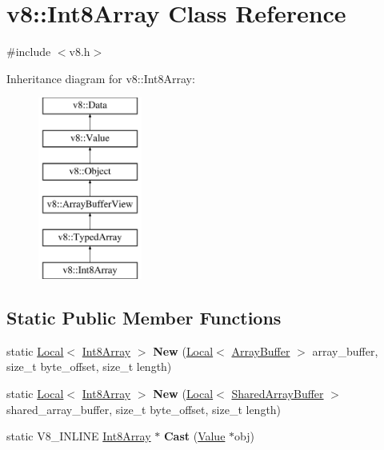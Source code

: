 \hypertarget{classv8_1_1Int8Array}{}\section{v8\+:\+:Int8\+Array Class Reference}
\label{classv8_1_1Int8Array}


{\ttfamily \#include $<$v8.\+h$>$}

Inheritance diagram for v8\+:\+:Int8\+Array\+:\begin{figure}[H]
\begin{center}
\leavevmode
\includegraphics[height=6.000000cm]{classv8_1_1Int8Array}
\end{center}
\end{figure}
\subsection*{Static Public Member Functions}
\begin{DoxyCompactItemize}
\item 
static \hyperlink{classv8_1_1Local}{Local}$<$ \hyperlink{classv8_1_1Int8Array}{Int8\+Array} $>$ {\bfseries New} (\hyperlink{classv8_1_1Local}{Local}$<$ \hyperlink{classv8_1_1ArrayBuffer}{Array\+Buffer} $>$ array\+\_\+buffer, size\+\_\+t byte\+\_\+offset, size\+\_\+t length)\hypertarget{classv8_1_1Int8Array_a13e12d1a556aa2ef92271484a10acd21}{}\label{classv8_1_1Int8Array_a13e12d1a556aa2ef92271484a10acd21}

\item 
static \hyperlink{classv8_1_1Local}{Local}$<$ \hyperlink{classv8_1_1Int8Array}{Int8\+Array} $>$ {\bfseries New} (\hyperlink{classv8_1_1Local}{Local}$<$ \hyperlink{classv8_1_1SharedArrayBuffer}{Shared\+Array\+Buffer} $>$ shared\+\_\+array\+\_\+buffer, size\+\_\+t byte\+\_\+offset, size\+\_\+t length)\hypertarget{classv8_1_1Int8Array_a364d52f1dc634e637321b2a9f9ec4dd8}{}\label{classv8_1_1Int8Array_a364d52f1dc634e637321b2a9f9ec4dd8}

\item 
static V8\+\_\+\+I\+N\+L\+I\+NE \hyperlink{classv8_1_1Int8Array}{Int8\+Array} $\ast$ {\bfseries Cast} (\hyperlink{classv8_1_1Value}{Value} $\ast$obj)\hypertarget{classv8_1_1Int8Array_a201a6b46e2cc455830d62c57bc8b4a3e}{}\label{classv8_1_1Int8Array_a201a6b46e2cc455830d62c57bc8b4a3e}

\end{DoxyCompactItemize}
